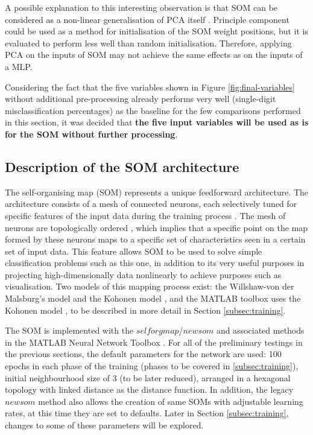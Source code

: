 \documentclass[10pt, oneside]{article}
\begin{document}
A possible explanation to this interesting observation is that SOM can be considered as a non-linear generalisation of PCA itself \cite[p. 1]{akinduko2012initialization}. Principle component could be used as a method for initialisation of the SOM weight positions, but it is evaluated to perform less well than random initialisation. Therefore, applying PCA on the inputs of SOM may not achieve the same effects as on the inputs of a MLP. 

Considering the fact that the five variables shown in Figure \ref{fig:final-variables} without additional pre-processing already performs very well (single-digit misclassification percentages) as the baseline for the few comparisons performed in this section, it was decided that \textbf{the five input variables will be used as is for the SOM without further processing}.

\subsection{Description of the SOM architecture}

The self-organising map (SOM) represents a unique feedforward architecture. The architecture consists of a mesh of connected neurons, each selectively tuned for specific features of the input data during the training process \cite[Sec. 9.1]{haykin2008}. The mesh of neurons are topologically ordered \cite[p. 11]{som-lecture}, which implies that a specific point on the map formed by these neurons maps to a specific set of characteristics seen in a certain set of input data. This feature allows SOM to be used to solve simple classification problems such as this one, in addition to its very useful purposes in projecting high-dimensionally data nonlinearly to achieve purposes such as visualisation. Two models of this mapping process exist: the Willshaw-von der Malsburg's model and the Kohonen model \cite[Sec. 9.2]{haykin2008}, and the MATLAB toolbox uses the Kohonen model \cite{som-matlab}, to be described in more detail in Section \ref{subsec:training}.

The SOM is implemented with the $selforgmap$/$newsom$ and associated methods in the MATLAB Neural Network Toolbox \cite{kohonen2014matlab}. For all of the preliminary testings in the previous sections, the default parameters for the network are used: 100 epochs in each phase of the training (phases to be covered in \ref{subsec:training}), initial neighbourhood size of 3 (to be later reduced), arranged in a hexagonal topology with linked distance as the distance function. In addition, the legacy $newsom$ method also allows the creation of same SOMs with adjustable learning rates, at this time they are set to defaults. Later in Section \ref{subsec:training}, changes to some of these parameters will be explored.
\end{document}
